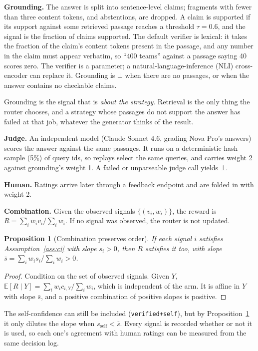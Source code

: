 \documentclass[conference]{IEEEtran}
\newtheorem{proposition}{Proposition}
\theoremstyle{definition}
\theoremstyle{remark}
\newcommand{\E}{\mathbb{E}}
\begin{document}
\textbf{Grounding.} The answer is split into sentence-level claims; fragments with fewer than three content tokens, and abstentions, are dropped. A claim is supported if its support against some retrieved passage reaches a threshold $\tau=0.6$, and the signal is the fraction of claims supported. The default verifier is lexical: it takes the fraction of the claim's content tokens present in the passage, and any number in the claim must appear verbatim, so ``400 teams'' against a passage saying 40 scores zero. The verifier is a parameter; a natural-language-inference (NLI) cross-encoder can replace it. Grounding is $\bot$ when there are no passages, or when the answer contains no checkable claims.

Grounding is the signal that is \emph{about the strategy}. Retrieval is the only thing the router chooses, and a strategy whose passages do not support the answer has failed at that job, whatever the generator thinks of the result.

\textbf{Judge.} An independent model (Claude Sonnet 4.6, grading Nova Pro's answers) scores the answer against the same passages. It runs on a deterministic hash sample (5\%) of query ids, so replays select the same queries, and carries weight 2 against grounding's weight 1. A failed or unparseable judge call yields $\bot$.

\textbf{Human.} Ratings arrive later through a feedback endpoint and are folded in with weight 2.

\textbf{Combination.} Given the observed signals $\{(v_i,w_i)\}$, the reward is $R=\sum_i w_iv_i/\sum_iw_i$. If no signal was observed, the router is not updated.

\begin{proposition}[Combination preserves order]\label{prop:combine}
If each signal $i$ satisfies Assumption~\ref{ass:ci} with slope $s_i>0$, then $R$ satisfies it too, with slope $\bar s=\sum_i w_is_i/\sum_iw_i>0$.
\end{proposition}
\begin{proof}
Condition on the set of observed signals. Given $Y$, $\E[R\mid Y]=\sum_iw_ic_{i,Y}/\sum_iw_i$, which is independent of the arm. It is affine in $Y$ with slope $\bar s$, and a positive combination of positive slopes is positive.
\end{proof}
The self-confidence can still be included (\texttt{verified+self}), but by Proposition~\ref{prop:combine} it only dilutes the slope when $s_{\text{self}}<\bar s$. Every signal is recorded whether or not it is used, so each one's agreement with human ratings can be measured from the same decision log.
\end{document}
